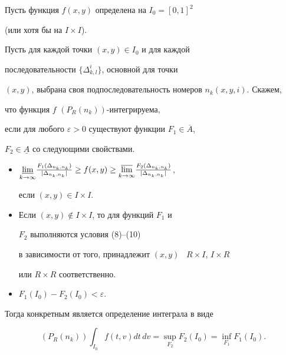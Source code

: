 \begin{defn}


Пусть функция $f(x,y)$ определена на $I_{0}=[0,1]^{2}$


(или хотя бы на $I\times I$). 


Пусть для каждой точки $(x,y)\in I_{0}$ и для каждой 


последовательности $\{\Delta_{k,l}^{i}\}$, основной для точки 


$(x,y)$, выбрана своя подпоследовательность номеров $n_{k}(x,y,i)$. Скажем,


что функция $f$  $(P_{R}(n_{k})) $-интегрируема,


если для любого $\varepsilon >0$ существуют функции $F_{1}\in \overline{A}$,


$F_{2}\in \underline{A}$ со следующими свойствами.


\begin{itemize}


\item[1.] $\underset{k \to \infty}{\varliminf}{}


\frac{F_{1}


(\Delta_{n_k,n_k})}{|\Delta_{n_k,n_k}|}\ge f(x,y)\ge


\underset{k \to \infty}{\varlimsup}{}


\frac{F_{2}(\Delta_{n_k,n_k})}{|\Delta_{n_k,n_k}|}$,


если $(x,y)\in I\times I$.


\item[2.] Если $(x,y)\notin I\times I$, то для функций $F_{1}$ и


$F_{2}$ выполняются условия (8)--(10)


в зависимости от того, принадлежит $(x,y)$ \ $R\times I$, $I\times R$


или $R\times R$ соответственно.


\item[3.] $F_{1}(I_{0})-F_{2}(I_{0})<\varepsilon $.


\end{itemize}





Тогда конкретным является определение интеграла в виде


$$


(P_{R}(n_{k}))\int_{I_{0}}f(t,v)dt\,dv=\sup\limits_{F_{2}}F_{2}(I_{0})


=\inf\limits_{F_{1}}F_{1}(I_{0}).


$$


\end{defn}





